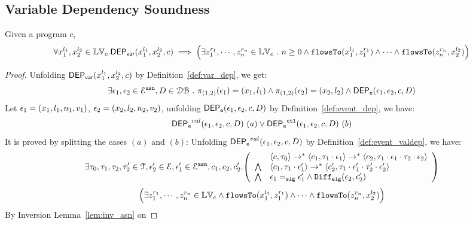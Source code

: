 {
\clearpage
\subsection{Variable Dependency Soundness}
\begin{thm}
Given a program ${c}$, 
\[
  \forall {x}_1^{l_1}, {x}_2^{l_2} \in \mathbb{LV}_{{c}}.
  \mathsf{DEP_{var}}({x}_1^{l_1}, {x}_2^{l_2}, {c})
  \implies 
  \Big( \exists z_1^{r_1}, \cdots, z_n^{r_n} \in \mathbb{LV}_{{c}} ~.~ n \geq 0 \land
  \mathtt{flowsTo}(x_1^{l_1}, z_1^{r_1}) 
  \land \cdots \land \mathtt{flowsTo}(z_n^{r_n}, {x}_2^{l_2}) \Big)
\]
\end{thm}
\begin{proof}
Unfolding $\mathsf{DEP_{var}}({x}_1^{l_1}, {x}_2^{l_2}, {c})$ by Definition~\ref{def:var_dep},
we get:
\[
\exists \mathtt{\epsilon}_1, \mathtt{\epsilon}_2 \in \mathcal{E}^{\mathtt{{asn}}}, D \in \mathcal{DB} ~.~
\pi_{(1,2)}{(\mathtt{\epsilon}_1)} = ({x}_1, l_1)
\land
\pi_{(1,2)}{(\mathtt{\epsilon}_2)} = ({x}_2, l_2)
\land 
\mathsf{DEP_{\mathtt{e}}}(\mathtt{\epsilon}_1, \mathtt{\epsilon}_2, c, D)
\]
%
Let $\mathtt{\epsilon}_1 = (x_1, l_1, n_1, v_1)$, $\mathtt{\epsilon}_2 = (x_2, l_2, n_2, v_2)$, unfolding $\mathsf{DEP_{\mathtt{e}}}(\mathtt{\epsilon}_1, \mathtt{\epsilon}_2, c, D)$ by Definition~\ref{def:event_dep}, we have:
\[
\mathsf{DEP_{\mathtt{e}}}^{val}(\mathtt{\epsilon}_1, \mathtt{\epsilon}_2, c, D) ~ (a) 
\lor
\mathsf{DEP_{\mathtt{e}}}^{\mathtt{{ctl}}}(\mathtt{\epsilon}_1, \mathtt{\epsilon}_2, c, D) ~ (b)
\]
%
It is proved by splitting the cases $(a)$ and $(b)$:
%
%
Unfolding $\mathsf{DEP_{\mathtt{e}}}^{val}(\mathtt{\epsilon}_1, \mathtt{\epsilon}_2, c, D)$ by Definition~\ref{def:event_valdep}, we have:
\[
\exists \vtrace_0,
\vtrace_1, \vtrace_2, \vtrace_2' \in \mathcal{T}, \event_2' \in \eventset, \event_1' \in \eventset^{\asn}, {c}_1, {c}_2,  {c}_2'.
\left(
  \begin{array}{ll}   
 & \config{{c}, \vtrace_0} \rightarrow^{*} 
  \config{{c}_1, \vtrace_1 \cdot \event_1}  \rightarrow^{*} 
  \config{{c}_2,  \vtrace_1 \cdot \event_1 \cdot \vtrace_2 \cdot \event_2}
 \\ 
 \bigwedge &
  \config{{c}_1, \vtrace_1 \cdot \event_1'}  \rightarrow^{*} 
  \config{{c}_2',  \vtrace_1 \cdot \event_1'  \cdot \vtrace_2' \cdot \event_2'}
\\
\bigwedge & \event_1 \sigeq \event_1' \land \sigdiff(\event_2,\event_2')
\end{array}
\right)
 \]
%
%
 \[
 \Big(\exists z_1^{r_1}, \cdots, z_n^{r_n} \in \mathbb{LV}_{{c}} 
 \land \mathtt{flowsTo}(x_1^{l_1}, z_1^{r_1}) \land \cdots \land \mathtt{flowsTo}(z_n^{r_n}, {x}_2^{l_2}) \Big)
  \]
%
By Inversion Lemma~\ref{lem:inv_asn} on 

\end{proof}}
